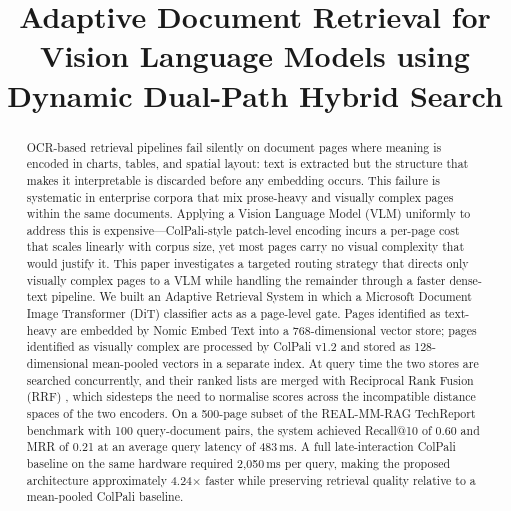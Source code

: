 \documentclass[conference]{IEEEtran}
\begin{document}
 
\title{Adaptive Document Retrieval for \\ Vision Language Models using Dynamic Dual-Path Hybrid Search}
 
\author{
\and
{}
}
 
\maketitle
 
\begin{abstract}
OCR-based retrieval pipelines fail silently on document pages where meaning is encoded in charts, tables, and spatial layout: text is extracted but the structure that makes it interpretable is discarded before any embedding occurs. This failure is systematic in enterprise corpora that mix prose-heavy and visually complex pages within the same documents. Applying a Vision Language Model (VLM) uniformly to address this is expensive—ColPali-style patch-level encoding incurs a per-page cost that scales linearly with corpus size, yet most pages carry no visual complexity that would justify it. This paper investigates a targeted routing strategy that directs only visually complex pages to a VLM while handling the remainder through a faster dense-text pipeline. We built an Adaptive Retrieval System in which a Microsoft Document Image Transformer (DiT) classifier acts as a page-level gate. Pages identified as text-heavy are embedded by Nomic Embed Text into a 768-dimensional vector store; pages identified as visually complex are processed by ColPali v1.2 and stored as 128-dimensional mean-pooled vectors in a separate index. At query time the two stores are searched concurrently, and their ranked lists are merged with Reciprocal Rank Fusion (RRF) \cite{cormack2009reciprocal}, which sidesteps the need to normalise scores across the incompatible distance spaces of the two encoders. On a 500-page subset of the REAL-MM-RAG TechReport benchmark \cite{ma2024realmmrag} with 100 query-document pairs, the system achieved Recall@10 of 0.60 and MRR of 0.21 at an average query latency of 483\,ms. A full late-interaction ColPali baseline on the same hardware required 2,050\,ms per query, making the proposed architecture approximately 4.24$\times$ faster while preserving retrieval quality relative to a mean-pooled ColPali baseline.
\end{abstract}
 
\end{document}
